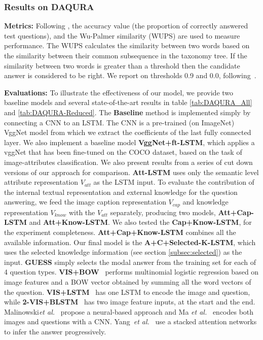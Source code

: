 \documentclass[10pt,journal,compsoc]{IEEEtran}
\newcommand{\etal}{\emph{et al.}}
\def\Att{{V_{att}}}
\def\Cap{{V_{cap}}}
\def\Know{{V_{know}}}
\begin{document}
\subsubsection{Results on DAQURA}
\textbf{Metrics:}
Following \cite{ma2015learning, ren2015image}, the accuracy value (the proportion of correctly answered test questions), and the Wu-Palmer similarity (WUPS) \cite{wu1994verbs} are used to measure performance. The WUPS calculates the similarity between two words based on the similarity between their common subsequence in the taxonomy tree. If the similarity between two words is greater than a threshold then the candidate answer is considered to be right. We report on thresholds 0.9 and 0.0, following~\cite{ma2015learning,ren2015image}.

\vspace{3pt}
\noindent\textbf{Evaluations:}
To illustrate the effectiveness of our model, we provide two baseline models and several state-of-the-art results in table \ref{tab:DAQURA_All} and \ref{tab:DAQURA-Reduced}. The \textbf{Baseline} method is implemented simply by connecting a CNN to an LSTM. The CNN is a pre-trained (on ImageNet) VggNet model from which we extract the coefficients of the last fully connected layer. We also implement a baseline model \textbf{VggNet+ft-LSTM}, which applies a vggNet that has been fine-tuned on the COCO dataset, based on the task of image-attributes classification. We also present results from a series of cut down versions of our approach for comparison. \textbf{Att-LSTM} uses only the semantic level attribute representation $\Att$ as the LSTM input. To evaluate the contribution of the internal textual representation and external knowledge for the question answering, we feed the image caption representation $\Cap$ and knowledge representation $\Know$ with the $\Att$ separately, producing two models, \textbf{Att+Cap-LSTM} and \textbf{Att+Know-LSTM}. We also tested the \textbf{Cap+Know-LSTM}, for the experiment completeness. \textbf{Att+Cap+Know-LSTM} combines all the available information. Our final model is the \textbf{A+C+Selected-K-LSTM}, which uses the selected knowledge information (see section \ref{subsec:selected}) as the input. \textbf{GUESS} \cite{ren2015image} simply selects the modal answer from the training set for each of 4 question types.  \textbf{VIS+BOW}~\cite{ren2015image} performs multinomial logistic regression based on image features and a BOW vector obtained by summing all the word vectors of the question. \textbf{VIS+LSTM}~\cite{ren2015image} has one LSTM to encode the image and question, while \textbf{2-VIS+BLSTM}~\cite{ren2015image} has two image feature inputs, at the start and the end. Malinowski\etal~\cite{malinowski2015ask} propose a neural-based approach and Ma \textit{et al.}~\cite{ma2015learning} encodes both images and questions with a CNN. Yang~\etal~\cite{yang2015stacked} use a stacked attention networks to infer the answer progressively.
\end{document}

